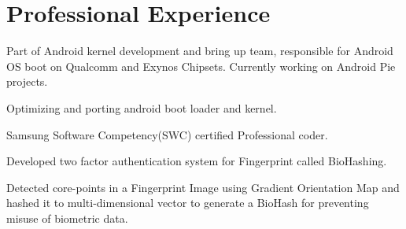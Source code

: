 \documentclass[]{deedy-resume-openfont}
\begin{document}
\begin{minipage}[t]{0.69\textwidth} 

\section{Professional Experience}
\vspace{3.5mm}
\begin{tightemize}
\item Part of Android kernel development and bring up team, responsible for Android OS boot on Qualcomm and Exynos Chipsets. Currently working on Android Pie projects.
\item Optimizing and porting android boot loader and kernel.
\item Samsung Software Competency(SWC) certified Professional coder.
\end{tightemize}
\begin{tightemize}
\item Developed two factor authentication system for Fingerprint called BioHashing.
\item Detected core-points in a Fingerprint Image using Gradient Orientation Map and hashed it to multi-dimensional vector to generate a BioHash for preventing misuse of biometric data.
\end{tightemize} 

\end{minipage}
\end{document}
